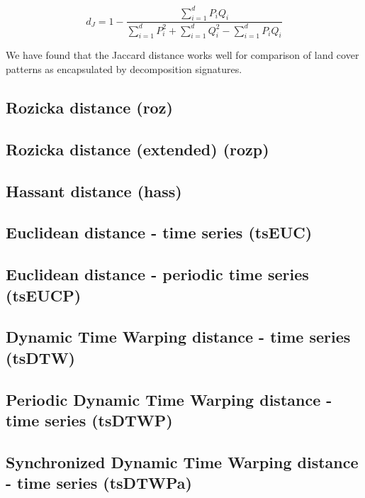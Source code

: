 \begin{equation} \label{eq:Jaccard}
d_J= 1-\dfrac
{\sum\limits_{i=1}^{d} P_i Q_i}
{\sum\limits_{i=1}^{d} P_i^2 + \sum\limits_{i=1}^{d} Q_i^2 - \sum\limits_{i=1}^{d} P_i Q_i}
\end{equation}

\noindent We have found that the Jaccard distance works well for comparison of land cover patterns as encapsulated by decomposition signatures.

\subsection{Rozicka distance (roz)}


\subsection{Rozicka distance (extended) (rozp)}

\subsection{Hassant distance (hass)}

\subsection{Euclidean distance - time series (tsEUC)}

\subsection{Euclidean distance - periodic time series (tsEUCP)}

\subsection{Dynamic Time Warping distance - time series (tsDTW)}

\subsection{Periodic Dynamic Time Warping distance - time series (tsDTWP)}

\subsection{Synchronized Dynamic Time Warping distance - time series (tsDTWPa)}